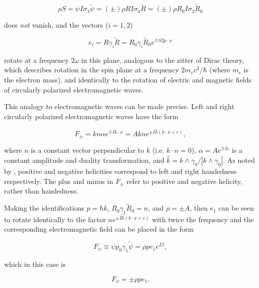 \documentclass{article}
\begin{document}
  \begin{equation}
    \rho S = \psi I \sigma_3 \widetilde \psi = (\pm) \rho  R I \sigma_3 \widetilde R = (\pm) \rho R_0 I \sigma_3 \widetilde R_0
  \end{equation}

  does \emph{not} vanish, and the vectors ($i = 1, 2$)

  \begin{equation}
    e_i = R \gamma_i \widetilde R = R_0 \gamma_i \widetilde R_0 e^{\mp S 2 p \cdot x}
  \end{equation} 

  rotate at a frequency $2 \omega$ in this plane, analogous to the zitter of Dirac theory, which describes rotation in the spin plane at a frequency $2 m_e c^2 / \hbar$ (where $m_e$ is the electron mass), and identically to the rotation of electric and magnetic fields of circularly polarized electromagnetic waves.

  This analogy to electromagnetic waves can be made precise. Left and right circularly polarized electromagnetic waves have the form\cite{gap}

    \begin{equation}
      F_\pm = k n \alpha e^{\mp I k \cdot x} = A k n e^{\pm I \hat k (k \cdot x + c)},\label{eq:emwaves}
    \end{equation}

    where $n$ is a constant vector perpendicular to $k$ (i.e. $k \cdot n= 0$), $\alpha = A e^{\mp I c}$ is a constant amplitude and duality transformation, and $\hat k = k \wedge \gamma_0 / |k \wedge \gamma_0|$. As noted by \cite{gap}, positive and negative helicities correspond to left and right handedness respectively. The plus and minus in $F_\pm$ refer to positive and negative helicity, rather than handedness.

    Making the identifications $p = \hbar k$, $R_0 \gamma_1 \widetilde R_0 = n$, and $\rho = \pm A$, then $e_1$ can be seen to rotate identically to the factor $n e^{\pm I \hat k (k \cdot x + c)}$ with twice the frequency and the corresponding electromagnetic field can be placed in the form

    \begin{equation}
      F_\psi \equiv \psi p_0 \gamma_1 \widetilde \psi = \rho p e_1 e^{I \beta}, \label{eq:emfield}
    \end{equation}

    which in this case is

    \begin{equation}
      F_\psi = \pm \rho p e_1.
    \end{equation}
\end{document}
